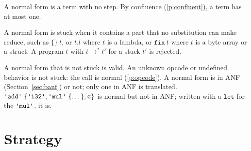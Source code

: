 \documentclass[11pt,letterpaper]{article}
\newcommand{\steps}{\mathrel{\longrightarrow^{*}}} %
\newcommand{\kw}[1]{\mathtt{#1}}
\newcommand{\str}[1]{\text{\ttfamily\textquotesingle #1\textquotesingle}}  %
\newcommand{\pref}[1]{\ref{#1}}  %
\begin{document}
\begin{points}
\item\label{p:normal} A normal form is a term with no step. By confluence (\pref{p:confluent}), a term has at most one.
\item\label{p:stuck} A normal form is stuck when it contains a part that no substitution can make
  reduce, such as $\{\}\ t$, or $t.l$ where $t$ is a lambda, or $\kw{fix}\ t$ where $t$ is a byte array or a struct. A
  program $t$ with $t \steps t'$ for a stuck $t'$ is rejected.
\item\label{p:forms} A normal form that is not stuck is valid. An unknown opcode or undefined behavior is not stuck: the call is normal (\pref{p:opcode}). A normal form is in ANF (Section~\ref{sec:banf}) or
  not; only one in ANF is translated. $\str{add}\ \{\str{i32}, \str{mul}\ \{\dots\}, x\}$
  is normal but not in ANF; written with a  $\kw{let}$ for the $\str{mul}$, it is.
\end{points}



\section{Strategy}\label{sec:strategy}
\end{document}
